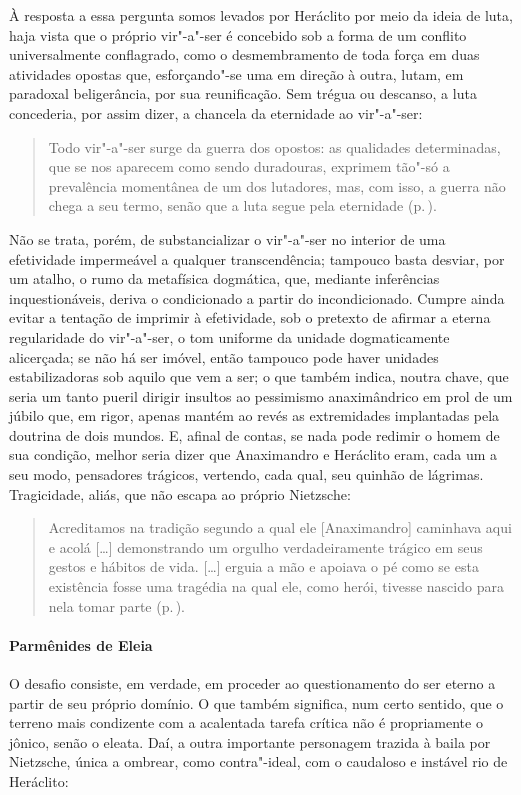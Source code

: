À resposta a essa pergunta somos levados por Heráclito por meio da ideia de
luta, haja vista que o próprio vir"-a"-ser é concebido sob a forma de um
conflito universalmente conflagrado, como o desmembramento de toda força em
duas atividades opostas que, esforçando"-se uma em direção à outra, lutam, em
paradoxal beligerância, por sua reunificação. Sem trégua ou descanso, a luta
concederia, por assim dizer, a chancela da eternidade ao vir"-a"-ser: 

\begin{quote} 
Todo vir"-a"-ser surge da guerra dos opostos: as qualidades
 determinadas, que se nos aparecem como sendo duradouras, exprimem tão"-só a
 prevalência momentânea de um dos lutadores, mas, com isso, a guerra não
 chega a seu termo, senão que a luta segue pela eternidade 
 (p.\,\pageref{sereterno}).
\end{quote} 

Não se trata, porém, de substancializar o vir"-a"-ser no interior de uma
efetividade impermeável a qualquer transcendência; tampouco basta desviar,
por um atalho, o rumo da metafísica dogmática, que, mediante inferências
inquestionáveis, deriva o condicionado a partir do incondicionado. Cumpre
ainda evitar a tentação de imprimir à efetividade, sob o pretexto de afirmar
a eterna regularidade do vir"-a"-ser, o tom uniforme da unidade
dogmaticamente alicerçada; se não há ser imóvel, então tampouco pode haver
unidades estabilizadoras sob aquilo que vem a ser; o que também indica,
noutra chave, que seria um tanto pueril dirigir insultos ao pessimismo
anaximândrico em prol de um júbilo que, em rigor, apenas mantém ao revés as
extremidades implantadas pela doutrina de dois mundos. E, afinal de contas,
se nada pode redimir o homem de sua condição, melhor seria dizer que
Anaximandro e Heráclito eram, cada um a seu modo, pensadores trágicos,
vertendo, cada qual, seu quinhão de lágrimas. Tragicidade, aliás, que não
escapa ao próprio Nietzsche:

\begin{quote} 
Acreditamos na tradição segundo a qual ele
 [Anaximandro] caminhava aqui e acolá [\ldots] demonstrando um orgulho
 verdadeiramente trágico em seus gestos e hábitos de vida. [\ldots] erguia a
 mão e apoiava o pé como se esta existência fosse uma tragédia na qual ele,
 como herói, tivesse nascido para nela tomar parte (p.\,\pageref{acreditamosnatradicao}).
\end{quote} 

\paragraph{Parmênides de Eleia} O desafio consiste, em verdade, em proceder ao
 questionamento do ser eterno a partir de seu próprio domínio. O que também
 significa, num certo sentido, que o terreno mais condizente com a acalentada
 tarefa crítica não é propriamente o jônico, senão o eleata. Daí, a outra
 importante personagem trazida à baila por Nietzsche, única a ombrear, como
 contra"-ideal, com o caudaloso e instável rio de Heráclito:

